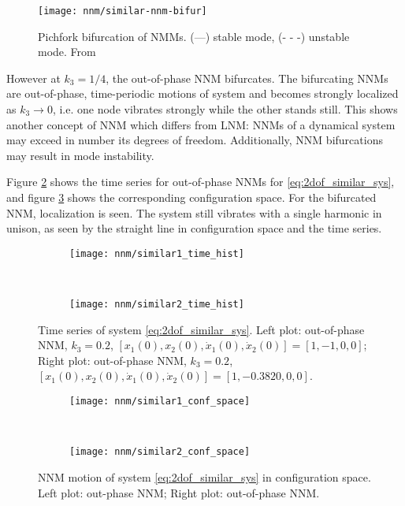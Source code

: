\begin{figure}[!ht]
  \centering
  \texttt{[image: nnm/similar-nnm-bifur]}
  \caption{Pichfork bifurcation of NMMs. (---) stable mode, (- - -) unstable
    mode. From \autocite{vakakis1992a}}
  \label{fig:nnm_similar_bifur}
\end{figure}


However at $k_3 = 1/4$, the out-of-phase NNM bifurcates. The bifurcating NNMs are
out-of-phase, time-periodic motions of system and becomes strongly localized as
$k_3 \to 0$, i.e. one node vibrates strongly while the other stands still. This
shows another concept of NNM which differs from LNM: NNMs of a dynamical system
may exceed in number its degrees of freedom. Additionally, NNM bifurcations may
result in mode instability.


Figure \ref{fig:similar_time_series} shows the time series for out-of-phase NNMs
for \eqref{eq:2dof_similar_sys}, and figure \ref{fig:similar_nnm_config} shows
the corresponding configuration space. For the bifurcated NNM, localization is
seen. The system still vibrates with a single harmonic in unison, as seen by the
straight line in configuration space and the time series.

\begin{figure}[!ht]
  \centering
  \begin{subfigure}[b]{0.45\textwidth}
    \texttt{[image: nnm/similar1\_time\_hist]}
  \end{subfigure}
  ~
  \begin{subfigure}[b]{0.45\textwidth}
    \texttt{[image: nnm/similar2\_time\_hist]}
  \end{subfigure}
  \caption{Time series of system \eqref{eq:2dof_similar_sys}.
    Left plot: out-of-phase NNM, $k_3=0.2$,
    $[x_1(0), x_2(0), \dot x_1(0), \dot x_2(0)] = [1,-1,0,0]$;
    Right plot: out-of-phase NNM, $k_3=0.2$,
    $[x_1(0), x_2(0), \dot x_1(0), \dot x_2(0)] = [1, -0.3820,0,0]$.}
  \label{fig:similar_time_series}
\end{figure}


\begin{figure}[!ht]
  \centering
  \begin{subfigure}[b]{0.45\textwidth}
    \texttt{[image: nnm/similar1\_conf\_space]}
  \end{subfigure}
  ~
  \begin{subfigure}[b]{0.45\textwidth}
    \texttt{[image: nnm/similar2\_conf\_space]}
  \end{subfigure}
  \caption{NNM motion of system \eqref{eq:2dof_similar_sys} in configuration space.
    Left plot: out-phase NNM;
    Right plot: out-of-phase NNM.}
  \label{fig:similar_nnm_config}
\end{figure}


